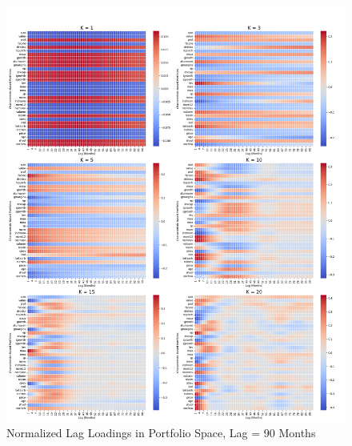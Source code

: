 \documentclass{article}
\begin{document}
\begin{figure}[H]
    \centering
    \includegraphics[width=1\linewidth]{WB_90_norm.png}
    \caption{Normalized Lag Loadings in Portfolio Space, Lag = 90 Months}
    \label{fig:WB_90_norm}
\end{figure}
\end{document}
